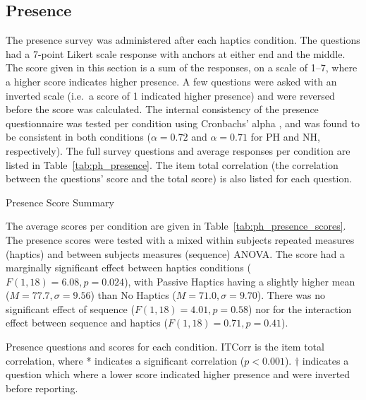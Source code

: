 \subsection{Presence}

The presence survey was administered after each haptics condition.
The questions had a 7-point Likert scale response with anchors at either end and the middle.
The score given in this section is a sum of the responses, on a scale of \numrange{1}{7}, where a higher score indicates higher presence.
A few questions were asked with an inverted scale (i.e.\ a score of 1 indicated higher presence) and were reversed before the score was calculated.
The internal consistency of the presence questionnaire was tested per condition using Cronbachs' alpha \citep{cronbach_coefficient_1951}, and was found to be consistent in both conditions ($\alpha=0.72$ and $\alpha=0.71$ for PH and NH, respectively).
The full survey questions and average responses per condition are listed in Table~\ref{tab:ph_presence}.
The item total correlation (the correlation between the questions' score and the total score) is also listed for each question.

\begin{table}
    \centering
    \small
    \caption{Presence Score Summary}
    \label{tab:ph_presence_scores}
\end{table}

The average scores per condition are given in Table~\ref{tab:ph_presence_scores}.
The presence scores were tested with a mixed within subjects repeated measures (haptics) and between subjects measures (sequence) ANOVA.
The score had a marginally significant effect between haptics conditions ($F(1,18)=6.08, p=0.024$), with Passive Haptics having a slightly higher mean ($M=77.7, \sigma=9.56$) than No Haptics ($M=71.0, \sigma=9.70$).
There was no significant effect of sequence ($F(1,18)=4.01, p=0.58$) nor for the interaction effect between sequence and haptics ($F(1,18)=0.71, p=0.41$).

\begin{sidewaystable}
    \centering
    \caption{Presence questions and scores for each condition. ITCorr is the item total correlation, where * indicates a significant correlation ($p<0.001$). $\dagger$ indicates a question which where a lower score indicated higher presence and were inverted before reporting.}
    \label{tab:ph_presence}
\end{sidewaystable}

